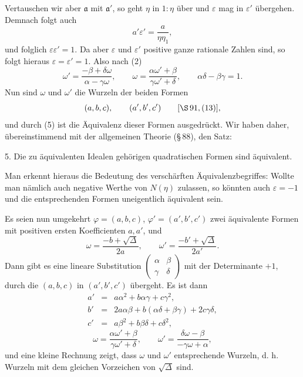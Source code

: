 \documentclass[11pt]{article}
\begin{document}
Vertauschen wir aber $\mathfrak a$ mit $\mathfrak a'$, so geht $\eta$ in $1:\eta$ über und $\varepsilon$ mag in $\varepsilon'$ übergehen. Demnach folgt auch
\begin{equation}
 a'\varepsilon'=\frac{a}{\eta\eta_1},
\tag{4}
\end{equation}
und folglich $\varepsilon\varepsilon'=1$. Da aber $\varepsilon$ und $\varepsilon'$ positive ganze rationale Zahlen sind, so folgt hieraus $\varepsilon=\varepsilon'=1$. Also nach (2)
\begin{equation}
 \omega'=\frac{-\beta+\delta\omega}{\alpha-\gamma\omega},\qquad
 \omega=\frac{\alpha\omega'+\beta}{\gamma\omega'+\delta},\qquad
 \alpha\delta-\beta\gamma=1.
\tag{5}
\end{equation}
Nun sind $\omega$ und $\omega'$ die Wurzeln der beiden Formen
\[
 (a,b,c),\qquad (a',b',c') \qquad [\S\,91,(13)],
\]
und durch (5) ist die Äquivalenz dieser Formen ausgedrückt. Wir haben daher, übereinstimmend mit der allgemeinen Theorie (\S\,88), den Satz:

5. Die zu äquivalenten Idealen gehörigen quadratischen Formen sind äquivalent.

Man erkennt hieraus die Bedeutung des verschärften Äquivalenzbegriffes: Wollte man nämlich auch negative Werthe von $N(\eta)$ zulassen, so könnten auch $\varepsilon=-1$ und die entsprechenden Formen uneigentlich äquivalent sein.

Es seien nun umgekehrt $\varphi=(a,b,c)$, $\varphi'=(a',b',c')$ zwei äquivalente Formen mit positiven ersten Koefficienten $a,a'$, und
\begin{equation}
 \omega=\frac{-b+\sqrt\Delta}{2a},\qquad
 \omega'=\frac{-b'+\sqrt\Delta}{2a'}.
\tag{6}
\end{equation}
Dann gibt es eine lineare Substitution $\begin{pmatrix}\alpha&\beta\\ \gamma&\delta\end{pmatrix}$ mit der Determinante $+1$, durch die $(a,b,c)$ in $(a',b',c')$ übergeht. Es ist dann
\begin{equation}
\begin{array}{rcl}
 a'&=&a\alpha^2+b\alpha\gamma+c\gamma^2,\\
 b'&=&2a\alpha\beta+b(\alpha\delta+\beta\gamma)+2c\gamma\delta,\\
 c'&=&a\beta^2+b\beta\delta+c\delta^2,
\end{array}
\tag{7}
\end{equation}
\begin{equation}
 \omega=\frac{\alpha\omega'+\beta}{\gamma\omega'+\delta},\qquad
 \omega'=\frac{\delta\omega-\beta}{-\gamma\omega+\alpha},
\tag{8}
\end{equation}
und eine kleine Rechnung zeigt, dass $\omega$ und $\omega'$ entsprechende Wurzeln, d. h. Wurzeln mit dem gleichen Vorzeichen von $\sqrt\Delta$ sind.
\end{document}
